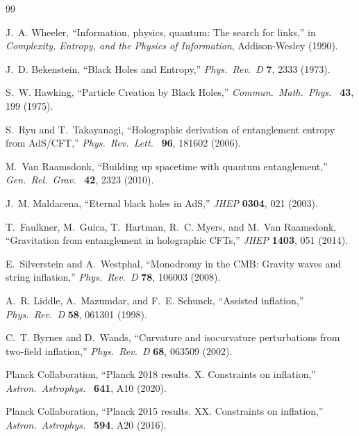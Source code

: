 \documentclass[11pt,a4paper]{article}
\theoremstyle{definition}
\begin{document}
\begin{thebibliography}{99}

J.~A. Wheeler, ``Information, physics, quantum: The search for links,'' in \textit{Complexity, Entropy, and the Physics of Information}, Addison-Wesley (1990).

J.~D. Bekenstein, ``Black Holes and Entropy,'' \textit{Phys.\ Rev.\ D} \textbf{7}, 2333 (1973).

S.~W. Hawking, ``Particle Creation by Black Holes,'' \textit{Commun.\ Math.\ Phys.\ } \textbf{43}, 199 (1975).

S.~Ryu and T.~Takayanagi, ``Holographic derivation of entanglement entropy from AdS/CFT,'' \textit{Phys.\ Rev.\ Lett.\ } \textbf{96}, 181602 (2006).

M.~Van Raamsdonk, ``Building up spacetime with quantum entanglement,'' \textit{Gen.\ Rel.\ Grav.\ } \textbf{42}, 2323 (2010).

J.~M. Maldacena, ``Eternal black holes in AdS,'' \textit{JHEP} \textbf{0304}, 021 (2003).

T.~Faulkner, M.~Guica, T.~Hartman, R.~C. Myers, and M.~Van Raamsdonk, ``Gravitation from entanglement in holographic CFTs,'' \textit{JHEP} \textbf{1403}, 051 (2014).

E.~Silverstein and A.~Westphal, ``Monodromy in the CMB: Gravity waves and string inflation,'' \textit{Phys.\ Rev.\ D} \textbf{78}, 106003 (2008).

A.~R. Liddle, A.~Mazumdar, and F.~E. Schunck, ``Assisted inflation,'' \textit{Phys.\ Rev.\ D} \textbf{58}, 061301 (1998).

C.~T. Byrnes and D.~Wands, ``Curvature and isocurvature perturbations from two-field inflation,'' \textit{Phys.\ Rev.\ D} \textbf{68}, 063509 (2002).

Planck Collaboration, ``Planck 2018 results. X. Constraints on inflation,'' \textit{Astron.\ Astrophys.\ } \textbf{641}, A10 (2020).

Planck Collaboration, ``Planck 2015 results. XX. Constraints on inflation,'' \textit{Astron.\ Astrophys.\ } \textbf{594}, A20 (2016).


\end{thebibliography}
\end{document}
